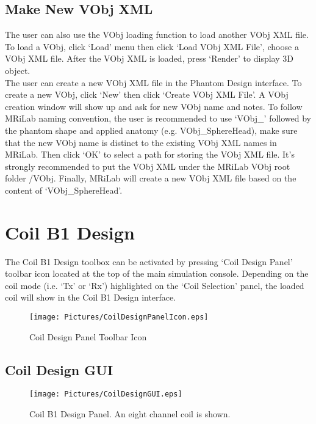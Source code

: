 \documentclass{book}%
\begin{document}
\subsection{Make New VObj XML}

The user can also use the VObj loading function to load another VObj XML file. To load a VObj, click `Load' menu then click `Load VObj XML File', choose a VObj XML file. After the VObj XML is loaded, press `Render' to display 3D object.\\

The user can create a new VObj XML file in the Phantom Design interface. To create a new VObj, click `New' then click `Create VObj XML File'. A VObj creation window will show up and ask for new VObj name and notes. To follow MRiLab naming convention, the user is recommended to use `VObj\_' followed by the phantom shape and applied anatomy (e.g. VObj\_SphereHead), make sure that the new VObj name is distinct to the existing VObj XML names in MRiLab. Then click `OK' to select a path for storing the VObj XML file. It's strongly recommended to put the VObj XML under the MRiLab VObj root folder /VObj. Finally, MRiLab will create a new VObj XML file based on the content of `VObj\_SphereHead'.

\section{Coil B1 Design}

The Coil B1 Design toolbox can be activated by pressing `Coil Design Panel' toolbar icon located at the top of the main simulation console. Depending on the coil mode (i.e. `Tx' or `Rx') highlighted on the `Coil Selection' panel, the loaded coil will show in the Coil B1 Design interface.

\begin{figure}[htbp]
	\centering
		\texttt{[image: Pictures/CoilDesignPanelIcon.eps]}
	\caption{Coil Design Panel Toolbar Icon}
	\label{fig:CoilDesignPanelIcon}
\end{figure}

\subsection{Coil Design GUI}

\begin{figure}[htbp]
	\centering
		\texttt{[image: Pictures/CoilDesignGUI.eps]}
	\caption{Coil B1 Design Panel. An eight channel coil is shown.}
	\label{fig:CoilDesignGUI}
\end{figure}
\end{document}
